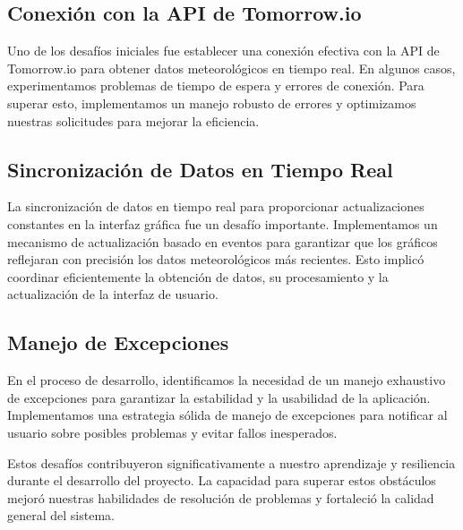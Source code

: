 \documentclass{article}
\begin{document}
\subsection{Conexión con la API de Tomorrow.io}
Uno de los desafíos iniciales fue establecer una conexión efectiva con la API de Tomorrow.io para obtener datos meteorológicos en tiempo real. En algunos casos, experimentamos problemas de tiempo de espera y errores de conexión. Para superar esto, implementamos un manejo robusto de errores y optimizamos nuestras solicitudes para mejorar la eficiencia.

\subsection{Sincronización de Datos en Tiempo Real}
La sincronización de datos en tiempo real para proporcionar actualizaciones constantes en la interfaz gráfica fue un desafío importante. Implementamos un mecanismo de actualización basado en eventos para garantizar que los gráficos reflejaran con precisión los datos meteorológicos más recientes. Esto implicó coordinar eficientemente la obtención de datos, su procesamiento y la actualización de la interfaz de usuario.

\subsection{Manejo de Excepciones}
En el proceso de desarrollo, identificamos la necesidad de un manejo exhaustivo de excepciones para garantizar la estabilidad y la usabilidad de la aplicación. Implementamos una estrategia sólida de manejo de excepciones para notificar al usuario sobre posibles problemas y evitar fallos inesperados.

Estos desafíos contribuyeron significativamente a nuestro aprendizaje y resiliencia durante el desarrollo del proyecto. La capacidad para superar estos obstáculos mejoró nuestras habilidades de resolución de problemas y fortaleció la calidad general del sistema.
\end{document}
